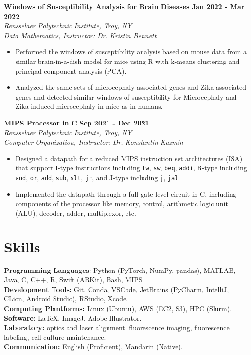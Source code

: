 \documentclass[letterpaper, 10pt]{article}
\newcommand{\subsectionvspace}{\vspace{6pt}}
\begin{document}
    \subsectionvspace

    \textbf{Windows of Susceptibility Analysis for Brain Diseases} \hfill 
    \textbf{Jan 2022 - Mar 2022} \\
    \textit{Rensselaer Polytechnic Institute, Troy, NY} \\
    \textit{Data Mathematics, Instructor: Dr. Kristin Bennett}
    \begin{itemize}
        \item Performed the windows of susceptibility analysis based on mouse data from a similar brain-in-a-dish model for mice using R with k-means clustering and principal component analysis (PCA).
        \item Analyzed the same sets of microcephaly-associated genes and Zika-associated genes and detected similar windows of susceptibility for Microcephaly and Zika-induced microcephaly in mice as in humans.
    \end{itemize}

    \subsectionvspace

    \textbf{MIPS Processor in C} \hfill 
    \textbf{Sep 2021 - Dec 2021} \\
    \textit{Rensselaer Polytechnic Institute, Troy, NY} \\
    \textit{Computer Organization, Instructor: Dr. Konstantin Kuzmin}
    \begin{itemize}
        \item Designed a datapath for a reduced MIPS instruction set architectures (ISA) that support I-type instructions including \verb|lw|, \verb|sw|, \verb|beq|, \verb|addi|, R-type including \verb|and|, \verb|or|, \verb|add|, \verb|sub|, \verb|slt|, \verb|jr|, and J-type including \verb|j|, \verb|jal|.
        \item Implemented the datapath through a full gate-level circuit in C, including components of the processor like memory, control, arithmetic logic unit (ALU), decoder, adder, multiplexor, etc.
    \end{itemize}


\section{Skills}


    \textbf{Programming Languages:} Python (PyTorch, NumPy, pandas), MATLAB, Java, C, C++, R, Swift (ARKit), Bash, MIPS. \\
    \textbf{Development Tools:} Git, Conda, VSCode, JetBrains (PyCharm, IntelliJ, CLion, Android Studio), RStudio, Xcode. \\
    \textbf{Computing Plantforms:} Linux (Ubuntu), AWS (EC2, S3), HPC (Slurm). \\
    \textbf{Software:} LaTeX, ImageJ, Adobe Illustrator. \\
    \textbf{Laboratory:} optics and laser alignment, fluorescence imaging, fluorescence labeling, cell culture maintenance. \\
    \textbf{Communication:} English (Proficient), Mandarin (Native).
\end{document}
